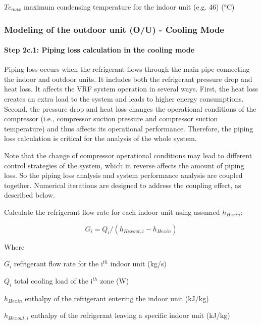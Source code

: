 $Tc_{max}$ maximum condensing temperature for the indoor unit (e.g. 46) (°C)

\subsubsection{Modeling of the outdoor unit (O/U) - Cooling Mode}\label{modeling-of-the-outdoor-unit-ou-cooling-mode}

\paragraph{Step 2c.1: Piping loss calculation in the cooling mode}\label{step-2c.1-piping-loss-calculation-in-the-cooling-mode}

Piping loss occurs when the refrigerant flows through the main pipe connecting the indoor and outdoor units. It includes both the refrigerant pressure drop and heat loss. It affects the VRF system operation in several ways. First, the heat loss creates an extra load to the system and leads to higher energy consumptions. Second, the pressure drop and heat loss changes the operational conditions of the compressor (i.e., compressor suction pressure and compressor suction temperature) and thus affects its operational performance. Therefore, the piping loss calculation is critical for the analysis of the whole system.

Note that the change of compressor operational conditions may lead to different control strategies of the system, which in reverse affects the amount of piping loss. So the piping loss analysis and system performance analysis are coupled together. Numerical iterations are designed to address the coupling effect, as described below.

Calculate the refrigerant flow rate for each indoor unit using assumed $h_{Hexin}$:

\begin{equation}
  G_i=Q_i/(h_{Hexout,i}-h_{Hexin})
\end{equation}

Where

$G_i$ refrigerant flow rate for the i\(^{th}\) indoor unit (kg/s) 

$Q_i$ total cooling load of the i\(^{th}\) zone (W) 

$h_{Hexin}$ enthalpy of the refrigerant entering the indoor unit (kJ/kg)

$h_{Hexout,i}$ enthalpy of the refrigerant leaving a specific indoor unit (kJ/kg)

